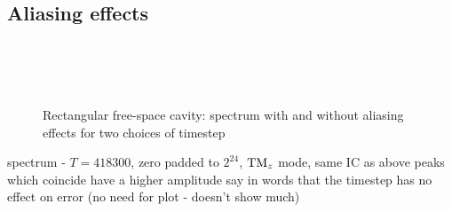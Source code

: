 \clearpage
\subsection{Aliasing effects}
\begin{figure}[!ht]
	\centering
{} \\
 \\
 \\
	\caption{Rectangular free-space cavity: spectrum with and without aliasing
    effects for two choices of timestep}
	\label{fig:rectangle2DfreeSpace_modesHF}
\end{figure}

spectrum - $T = 418300$, zero padded to $2^{ 24 }$, $\textrm{TM}_{z}$ mode, same IC as above
peaks which coincide have a higher amplitude
say in words that the timestep has no effect on error (no need for plot -
doesn't show much)


\clearpage
